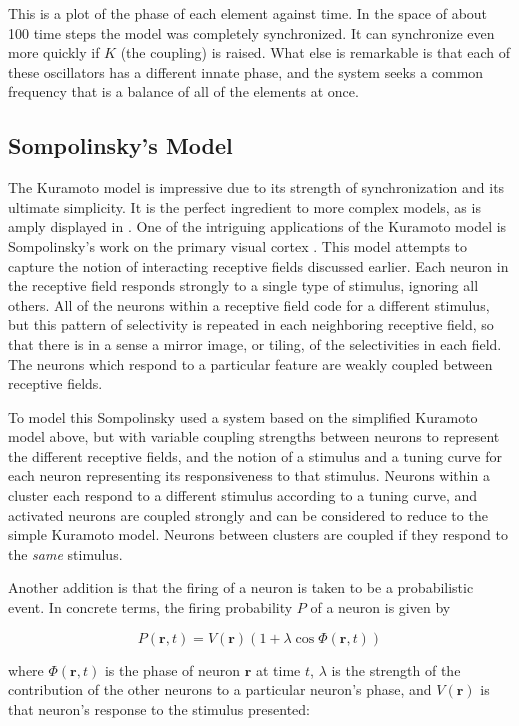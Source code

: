 \documentclass[12pt]{article}
\begin{document}
This is a plot of the phase of each element against time.  In the space of about 100 time steps the model was completely synchronized.  It can synchronize even more quickly if $K$ (the coupling) is raised.  What else is remarkable is that each of these oscillators has a different innate phase, and the system seeks a common frequency that is a balance of all of the elements at once.  

\subsection{Sompolinsky's Model}

The Kuramoto model is impressive due to its strength of synchronization and its ultimate simplicity.  It is the perfect ingredient to more complex models, as is amply displayed in \cite{Acebrón}.  One of the intriguing applications of the Kuramoto model is Sompolinsky's work on the primary visual cortex \cite{Sompolinsky}.  This model attempts to capture the notion of interacting receptive fields discussed earlier.  Each neuron in the receptive field responds strongly to a single type of stimulus, ignoring all others.  All of the neurons within a receptive field code for a different stimulus, but this pattern of selectivity is repeated in each neighboring receptive field, so that there is in a sense a mirror image, or tiling, of the selectivities in each field.  The neurons which respond to a particular feature are weakly coupled between receptive fields.  

To model this Sompolinsky used a system based on the simplified Kuramoto model above, but with variable coupling strengths between neurons to represent the different receptive fields, and the notion of a stimulus and a tuning curve for each neuron representing its responsiveness to that stimulus.  Neurons within a cluster each respond to a different stimulus according to a tuning curve, and activated neurons are coupled strongly and can be considered to reduce to the simple Kuramoto model.  Neurons between clusters are coupled if they respond to the {\em same} stimulus.  

Another addition is that the firing of a neuron is taken to be a probabilistic event.  In concrete terms, the firing probability $P$ of a neuron is given by 

$$ P(\mathbf{r},t)=V(\mathbf{r})(1+\lambda\cos\Phi(\mathbf{r},t)) $$

where $\Phi(\mathbf{r},t)$ is the phase of neuron $\mathbf{r}$ at time $t$, $\lambda$ is the strength of the contribution of the other neurons to a particular neuron's phase, and $V(\mathbf{r})$ is that neuron's response to the stimulus presented:
\end{document}
